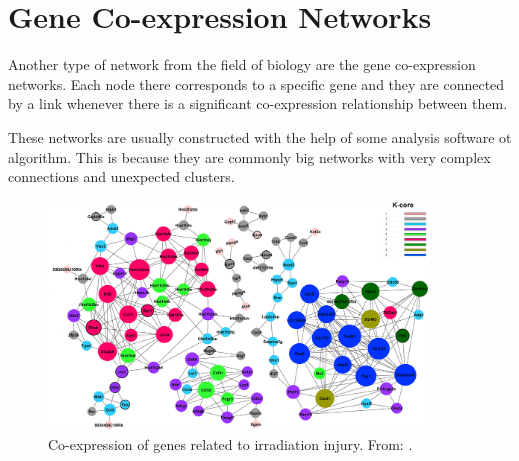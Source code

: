 \section{Gene Co-expression Networks}

    Another type of network from the field of biology are the gene co-expression networks. Each node there corresponds to a specific gene and they are connected by a link whenever there is a significant co-expression relationship between them.

    These networks are usually constructed with the help of some analysis software ot algorithm. This is because they are commonly big networks with very complex connections and unexpected clusters.

    \begin{figure}[H]
        \centering
        \includegraphics[width=0.9\textwidth]{images/pone-015.png}

        \caption{Co-expression of genes related to irradiation injury. From: \cite{zhang}.}
        \label{fig:gene-coexp}
    \end{figure}
